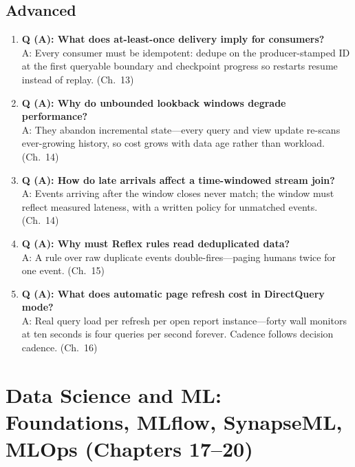 \subsection*{Advanced}
\begin{enumerate}
    \item \textbf{Q (A): What does at-least-once delivery imply for consumers?}\\
    A: Every consumer must be idempotent: dedupe on the producer-stamped ID at the first
    queryable boundary and checkpoint progress so restarts resume instead of replay. (Ch.~13)
    \item \textbf{Q (A): Why do unbounded lookback windows degrade performance?}\\
    A: They abandon incremental state---every query and view update re-scans ever-growing
    history, so cost grows with data age rather than workload. (Ch.~14)
    \item \textbf{Q (A): How do late arrivals affect a time-windowed stream join?}\\
    A: Events arriving after the window closes never match; the window must reflect measured
    lateness, with a written policy for unmatched events. (Ch.~14)
    \item \textbf{Q (A): Why must Reflex rules read deduplicated data?}\\
    A: A rule over raw duplicate events double-fires---paging humans twice for one event.
    (Ch.~15)
    \item \textbf{Q (A): What does automatic page refresh cost in DirectQuery mode?}\\
    A: Real query load per refresh per open report instance---forty wall monitors at ten
    seconds is four queries per second forever. Cadence follows decision cadence. (Ch.~16)
\end{enumerate}

\section{Data Science and ML: Foundations, MLflow, SynapseML, MLOps (Chapters 17--20)}


